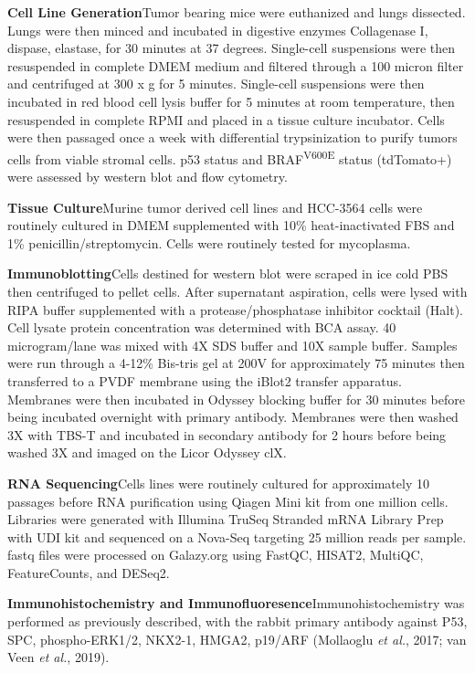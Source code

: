 \textbf{Cell Line Generation}Tumor bearing mice were euthanized and lungs dissected. Lungs were then minced and incubated in digestive enzymes Collagenase I, dispase, elastase, for 30 minutes at 37 degrees. Single-cell suspensions were then resuspended in complete DMEM medium and filtered through a 100 micron filter and centrifuged at 300 x g for 5 minutes. Single-cell suspensions were then incubated in red blood cell lysis buffer for 5 minutes at room temperature, then resuspended in complete RPMI and placed in a tissue culture incubator. Cells were then passaged once a week with differential trypsinization to purify tumors cells from viable stromal cells. p53 status and BRAF\textsuperscript{V600E} status (tdTomato+) were assessed by western blot and flow cytometry.

\textbf{Tissue Culture}Murine tumor derived cell lines and HCC-3564 cells were routinely cultured in DMEM supplemented with 10\% heat-inactivated FBS and 1\% penicillin/streptomycin. Cells were routinely tested for mycoplasma.

\textbf{Immunoblotting}Cells destined for western blot were scraped in ice cold PBS then centrifuged to pellet cells. After supernatant aspiration, cells were lysed with RIPA buffer supplemented with a protease/phosphatase inhibitor cocktail (Halt). Cell lysate protein concentration was determined with BCA assay. 40 microgram/lane was mixed with 4X SDS buffer and 10X sample buffer. Samples were run through a 4-12\% Bis-tris gel at 200V for approximately 75 minutes then transferred to a PVDF membrane using the iBlot2 transfer apparatus. Membranes were then incubated in Odyssey blocking buffer for 30 minutes before being incubated overnight with primary antibody. Membranes were then washed 3X with TBS-T and incubated in secondary antibody for 2 hours before being washed 3X and imaged on the Licor Odyssey clX.

\textbf{RNA Sequencing}Cells lines were routinely cultured for approximately 10 passages before RNA purification using Qiagen Mini kit from one million cells. Libraries were generated with Illumina TruSeq Stranded mRNA Library Prep with UDI kit and sequenced on a Nova-Seq targeting 25 million reads per sample. fastq files were processed on Galazy.org using FastQC, HISAT2, MultiQC, FeatureCounts, and DESeq2.

\textbf{Immunohistochemistry and Immunofluoresence}Immunohistochemistry was performed as previously described, with the rabbit primary antibody against P53, SPC, phospho-ERK1/2, NKX2-1, HMGA2, p19/ARF (Mollaoglu \emph{et al.}, 2017; van Veen \emph{et al.}, 2019).

